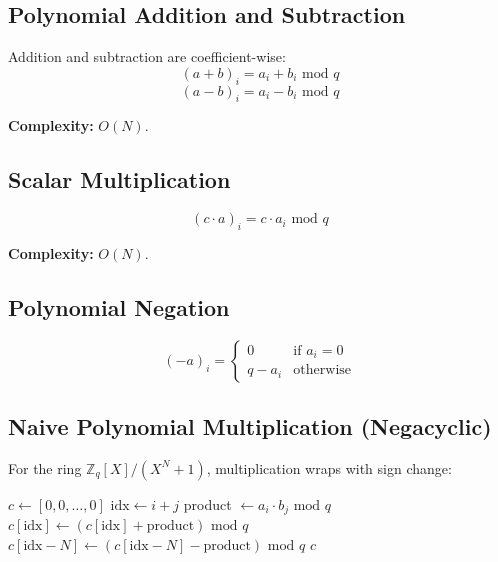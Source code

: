 \documentclass[11pt,a4paper]{article}
\newcommand{\Zq}{\mathbb{Z}_q}
\newcommand{\Rq}{R_q}
\newcommand{\bmod}{\text{ mod }}
\begin{document}
\subsection{Polynomial Addition and Subtraction}

Addition and subtraction are coefficient-wise:
\[
(a + b)_i = a_i + b_i \bmod q
\]
\[
(a - b)_i = a_i - b_i \bmod q
\]

\textbf{Complexity:} $O(N)$.

\subsection{Scalar Multiplication}

\[
(c \cdot a)_i = c \cdot a_i \bmod q
\]

\textbf{Complexity:} $O(N)$.

\subsection{Polynomial Negation}

\[
(-a)_i = \begin{cases}
0 & \text{if } a_i = 0 \\
q - a_i & \text{otherwise}
\end{cases}
\]

\subsection{Naive Polynomial Multiplication (Negacyclic)}

For the ring $\Zq[X]/(X^N + 1)$, multiplication wraps with sign change:

\begin{algorithm}[H]
\caption{Naive Polynomial Multiplication in $\Rq$}
\begin{algorithmic}[1]
    \State $c \gets [0, 0, \ldots, 0]$ 
            \State $\text{idx} \gets i + j$
            \State product $\gets a_i \cdot b_j \bmod q$
                \State $c[\text{idx}] \gets (c[\text{idx}] + \text{product}) \bmod q$
            \Else
                \State $c[\text{idx} - N] \gets (c[\text{idx} - N] - \text{product}) \bmod q$
            \EndIf
        \EndFor
    \EndFor
    \State \Return $c$
\EndFunction
\end{algorithmic}
\end{algorithm}
\end{document}
